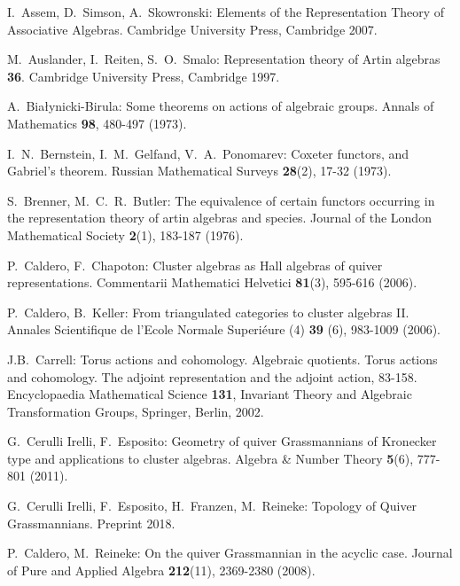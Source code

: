 \documentclass{amsart}
\numberwithin{equation}{section}
\begin{document}

\begin{thebibliography}{10}

  I.~Assem, D.~Simson, A.~Skowronski: Elements of the Representation Theory of Associative Algebras. Cambridge University Press, Cambridge 2007.

  M.~Auslander, I.~Reiten, S.~O.~Smalo: Representation theory of Artin algebras {\bf 36}. Cambridge University Press, Cambridge 1997.

  A.~Bia\l{}ynicki-Birula: Some theorems on actions of algebraic groups. Annals of Mathematics \textbf{98}, 480-497 (1973).

  I.~N.~Bernstein, I.~M.~Gelfand, V.~A.~Ponomarev: Coxeter functors, and Gabriel's theorem. Russian Mathematical Surveys \textbf{28}(2), 17-32 (1973).

  S.~Brenner, M.~C.~R.~Butler: The equivalence of certain functors occurring in the representation theory of artin algebras and species. Journal of the London Mathematical Society \textbf{2}(1), 183-187 (1976).

  P.~Caldero, F.~Chapoton: Cluster algebras as {H}all algebras of quiver representations. Commentarii Mathematici Helvetici \textbf{81}(3), 595-616 (2006).

  P.~Caldero, B.~Keller: From triangulated categories to cluster algebras II.  Annales Scientifique de l'Ecole Normale Superi\'{e}ure (4) \textbf{39} (6), 983-1009 (2006).

	J.B.~Carrell: Torus actions and cohomology. Algebraic quotients. Torus actions and cohomology. The adjoint representation and the adjoint action, 83-158. Encyclopaedia Mathematical Science \textbf{131}, Invariant Theory and Algebraic Transformation Groups, Springer, Berlin, 2002.

  G.~Cerulli Irelli, F.~Esposito: Geometry of quiver Grassmannians of Kronecker type and applications to cluster algebras. Algebra \&  Number Theory \textbf{5}(6), 777-801 (2011).

  G.~Cerulli Irelli, F.~Esposito, H.~Franzen, M.~Reineke: Topology of Quiver Grassmannians. Preprint 2018.

  P.~Caldero, M.~Reineke: On the quiver Grassmannian in the acyclic case. Journal of Pure and Applied Algebra \textbf{212}(11), 2369-2380 (2008).


\end{thebibliography}
\end{document}
